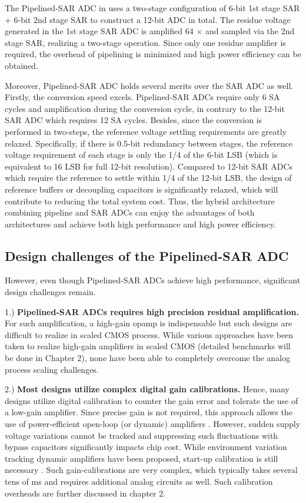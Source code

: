 The Pipelined-SAR ADC in \cite{lee2011sar2stagepipeline} uses a two-stage configuration of 6-bit 1st stage SAR + 6-bit 2nd stage SAR to construct a 12-bit ADC in total.
The residue voltage generated in the 1st stage SAR ADC is amplified 64 $\times$ and sampled via the 2nd stage SAR, realizing a two-stage operation.
Since only one residue amplifier is required, the overhead of pipelining is minimized and high power efficiency can be obtained.

Moreover, Pipelined-SAR ADC holds several merits over the SAR ADC as well.
Firstly, the conversion speed excels. Pipelined-SAR ADCs require only 6 SA cycles and amplification during the conversion cycle, in contrary to the 12-bit SAR ADC which requires 12 SA cycles.
Besides, since the conversion is performed in two-steps, the reference voltage settling requirements are greatly relaxed. 
Specifically, if there is 0.5-bit redundancy between stages, the reference voltage requirement of each stage is only the 1/4 of the 6-bit LSB (which is equivalent to 16 LSB for full 12-bit resolution). Compared to 12-bit SAR ADCs which require the reference to settle within 1/4 of the 12-bit LSB, the design of reference buffers or decoupling capacitors is significantly relaxed, which will contribute to reducing the total system cost.
Thus, the hybrid architecture combining pipeline and SAR ADCs can enjoy the advantages of both architectures and achieve both high performance and high power efficiency.

\subsection{Design challenges of the Pipelined-SAR ADC}
However, even though Pipelined-SAR ADCs achieve high performance, significant design challenges remain.

1.) \textbf{Pipelined-SAR ADCs requires high precision residual amplification.}
For such amplification, a high-gain opamp is indispensable but such designs are difficult to realize in scaled CMOS process.
While various approaches have been taken to realize high-gain amplifiers in scaled CMOS (detailed benchmarks will be done in Chapter 2), none have been able to completely overcome the analog process scaling challenges.

2.) \textbf{Most designs utilize complex digital gain calibrations.} Hence, many designs utilize digital calibration to counter the gain error and tolerate the use of a low-gain amplifier. Since precise gain is not required, this approach allows the use of power-efficient open-loop (or dynamic) amplifiers \cite{zhou201512} \cite{verbruggen201470}. However, sudden supply voltage variations cannot be tracked and suppressing such fluctuations with bypass capacitors significantly impacts chip cost. While environment variation tracking dynamic amplifiers have been proposed, start-up calibration is still necessary \cite{pvt-dynamicamp}. Such gain-calibrations are very complex, which typically takes several tens of ms and requires additional analog circuits as well. Such calibration overheads are further discussed in chapter 2.

